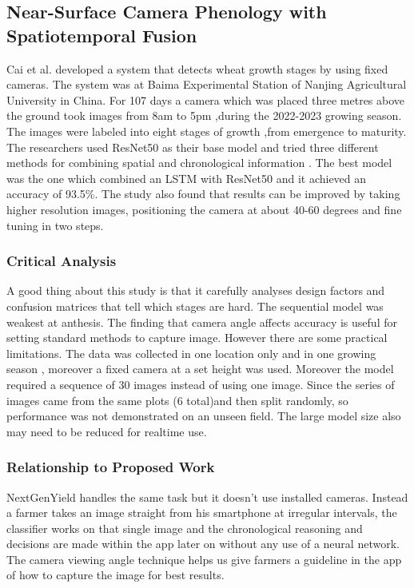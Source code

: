 \documentclass{FastFyp}
\begin{document}
\subsection{Near-Surface Camera Phenology with Spatiotemporal Fusion}

Cai et al. \cite{ref:Cai:2024} developed a system that detects wheat growth stages by using fixed cameras. The system was at Baima Experimental Station of Nanjing Agricultural University in China. For 107 days a camera which was placed three metres above the ground took images from 8am to 5pm ,during the 2022-2023 growing season. The images were labeled into eight stages of growth ,from emergence to maturity. The researchers used ResNet50 as their base model and tried three different methods for combining spatial and chronological information . The best model was the one which combined an LSTM with ResNet50 and it achieved an accuracy of 93.5\%. The study also found that results can be improved by taking higher resolution images, positioning the camera at about 40-60 degrees and fine tuning in two steps.

\subsubsection{Critical Analysis}
A good thing about this study is that it carefully analyses design factors and confusion matrices that tell which stages are hard. The sequential model was weakest at anthesis. The finding that camera angle affects accuracy is useful for setting standard methods to capture image. However there are some practical limitations. The data was collected in one location only and in one growing season , moreover a fixed camera at a set height was used. Moreover the model required a sequence of 30 images instead of using one image. Since the series of images came from the same plots (6 total)and then split randomly, so performance was not demonstrated on an unseen field. The large model size also may need to be reduced for realtime use.

\subsubsection{Relationship to Proposed Work}
NextGenYield handles the same task but it doesn't use installed cameras. Instead a farmer takes an image straight from his smartphone at irregular intervals, the classifier works on that single image and the chronological reasoning and decisions are made within the app later on without any use of a neural network. The camera viewing angle technique helps us give farmers a guideline in the app of how to capture the image for best results.
\end{document}
